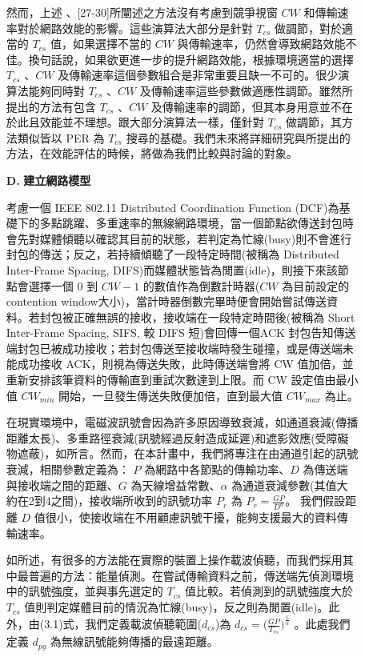 \documentclass[12pt,a4paper]{article}
\begin{document}
\begin{description}
\begin{enumerate}
然而，上述\cite{cccn08_phycs} 、[27-30]所闡述之方法沒有考慮到競爭視窗 $CW$ 和傳輸速率對於網路效能的影響。這些演算法大部分是針對 $T_{cs}$ 做調節，對於適當的 $T_{cs}$ 值，如果選擇不當的 $CW$ 與傳輸速率，仍然會導致網路效能不佳。換句話說，如果欲更進一步的提升網路效能，根據環境適當的選擇 $T_{cs}$ 、$CW$ 及傳輸速率這個參數組合是非常重要且缺一不可的。很少演算法能夠同時對 $T_{cs}$ 、$CW$ 及傳輸速率這些參數做適應性調節。雖然\cite{ton09_optwmn}所提出的方法有包含 $T_{cs}$ 、$CW$ 及傳輸速率的調節，但其本身用意並不在於此且效能並不理想。\cite{tmc09_aphycs}跟大部分演算法一樣，僅針對 $T_{cs}$ 做調節，其方法類似\cite{ton09_optwmn}皆以 PER 為 $T_{cs}$ 搜尋的基礎。我們未來將詳細研究\cite{tmc09_aphycs}與\cite{ton09_optwmn}所提出的方法，在效能評估的時候，將做為我們比較與討論的對象。 \\

\item [\bf D.]{\textbf{\Kai 建立網路模型 }}\\
\vspace{-2mm}

考慮一個 IEEE 802.11 Distributed Coordination Function (DCF)為基礎下的多點跳躍、多重速率的無線網路環境，當一個節點欲傳送封包時會先對媒體傾聽以確認其目前的狀態，若判定為忙線(busy)則不會進行封包的傳送；反之，若持續傾聽了一段特定時間(被稱為 Distributed Inter-Frame Spacing, DIFS)而媒體狀態皆為閒置(idle)，則接下來該節點會選擇一個 $0$ 到 $CW-1$ 的數值作為倒數計時器($CW$ 為目前設定的 contention window大小)，當計時器倒數完畢時便會開始嘗試傳送資料。若封包被正確無誤的接收，接收端在一段特定時間後(被稱為 Short Inter-Frame Spacing, SIFS, 較 DIFS 短)會回傳一個ACK 封包告知傳送端封包已被成功接收；若封包傳送至接收端時發生碰撞，或是傳送端未能成功接收 ACK，則視為傳送失敗，此時傳送端會將 CW 值加倍，並重新安排該筆資料的傳輸直到重試次數達到上限。而 CW 設定值由最小值 $CW_{min}$ 開始，一旦發生傳送失敗便加倍，直到最大值 $CW_{max}$ 為止。 

在現實環境中，電磁波訊號會因為許多原因導致衰減，如通道衰減(傳播距離太長)、多重路徑衰減(訊號經過反射造成延遲)和遮影效應(受障礙物遮蔽)，如\cite{book2002_wc}所言。然而，在本計畫中，我們將專注在由通道引起的訊號衰減，相關參數定義為： $P$ 為網路中各節點的傳輸功率、$D$ 為傳送端與接收端之間的距離、$G$ 為天線增益常數、$\alpha$ 為通道衰減參數(其值大約在2到4之間)，接收端所收到的訊號功率 $P_r$ 為 $P_r = \frac{GP}{D^ \alpha}$。 我們假設距離 $D$ 值很小，使接收端在不用顧慮訊號干擾，能夠支援最大的資料傳輸速率。 

如\cite{sigcomm05_rwpcs}所述，有很多的方法能在實際的裝置上操作載波偵聽，而我們採用其中最普遍的方法：能量偵測。在嘗試傳輸資料之前，傳送端先偵測環境中的訊號強度，並與事先選定的 $T_{cs}$ 值比較。若偵測到的訊號強度大於 $T_{cs}$ 值則判定媒體目前的情況為忙線(busy)，反之則為閒置(idle)。此外，由(3.1)式，我們定義載波偵聽範圍($d_{cs}$)為 $d_{cs} =  \big( \frac{GP}{T_{cs}} \big)^{ \frac{1}{\alpha}}$ 。此處我們定義 $d_{pg}$ 為無線訊號能夠傳播的最遠距離。 


\end{enumerate}
\end{description}
\end{document}
